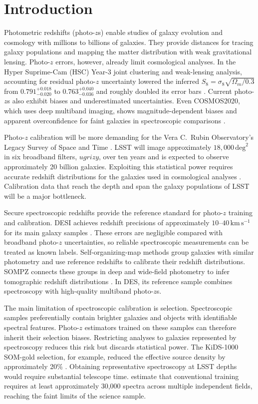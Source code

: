 \section{Introduction}\label{sec:intro}
Photometric redshifts (photo-$z$s) enable studies of galaxy evolution and
cosmology with millions to billions of galaxies. They provide distances
for tracing galaxy populations and mapping the matter distribution with
weak gravitational lensing. Photo-$z$ errors, however, already limit
cosmological analyses. In the Hyper Suprime-Cam (HSC) Year-3 joint
clustering and weak-lensing analysis, accounting for residual photo-$z$
uncertainty lowered the inferred $S_8=\sigma_8\sqrt{\Omega_m/0.3}$ from
$0.791^{+0.018}_{-0.020}$ to $0.763^{+0.040}_{-0.036}$ and roughly doubled
its error bars \citep{miyatake2023,hahn2024}. Current photo-$z$s also exhibit
biases and underestimated uncertainties. Even COSMOS2020, which uses deep
multiband imaging, shows magnitude-dependent biases and apparent
overconfidence for faint galaxies in spectroscopic comparisons
\citep{weaver2022}.

Photo-$z$ calibration will be more demanding for the Vera C.~Rubin
Observatory's Legacy Survey of Space and Time \citep[LSST;][]{ivezic2019}.
LSST will image approximately $18{,}000\,\mathrm{deg}^2$ in six broadband
filters, $ugrizy$, over ten years and is expected to observe approximately
20 billion galaxies. Exploiting this statistical power requires accurate
redshift distributions for the galaxies used in cosmological analyses
\citep{desc2018}. Calibration data that reach the depth and span the galaxy
populations of LSST will be a major bottleneck.

Secure spectroscopic redshifts provide the reference standard for photo-$z$
training and calibration. DESI achieves redshift precisions of approximately
$10$--$40\,\mathrm{km\,s^{-1}}$ for its main galaxy samples \citep{lan2023}.
These errors are negligible compared with broadband photo-$z$ uncertainties,
so reliable spectroscopic measurements can be treated as known labels.
Self-organizing-map methods group galaxies with similar photometry and use
reference redshifts to calibrate their redshift distributions. SOMPZ connects
these groups in deep and wide-field photometry to infer tomographic redshift
distributions \citep{buchs2019,myles2021}. In DES, its reference sample
combines spectroscopy with high-quality multiband photo-$z$s.

The main limitation of spectroscopic calibration is selection. Spectroscopic
samples preferentially contain brighter galaxies and objects with identifiable
spectral features. Photo-$z$ estimators trained on these samples can therefore
inherit their selection biases. Restricting analyses to galaxies represented
by spectroscopy reduces this risk but discards statistical power. The
KiDS-1000 SOM-gold selection, for example, reduced the effective source density
by approximately 20\% \citep{hildebrandt2021,giblin2021}. Obtaining
representative spectroscopy at LSST depths would require substantial telescope
time. \citet{newman2015} estimate that conventional training requires at least
approximately 30,000 spectra across multiple independent fields, reaching
the faint limits of the science sample.

